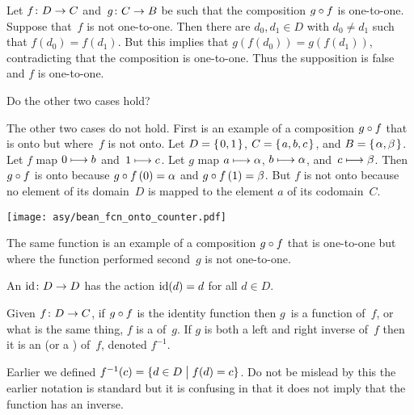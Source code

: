 \documentclass{ibl}  %
\begin{document}
\begin{problem}
\begin{exes}
\begin{exercise}
\end{exercise}
\begin{answer}
  Let $\mbox{$f\colon D\to C$}$ and~$\mbox{$g\colon C\to B$}$ be such that 
  the composition $g\mathbin{\circ} f$ is one-to-one.
  Suppose that~$f$ is not one-to-one.
  Then there are $d_0,d_1\in D$ with $d_0\neq d_1$ such that $f(d_0)=f(d_1)$.
  But this implies that $g(f(d_0))=g(f(d_1))$, contradicting that 
  the composition is one-to-one.
  Thus the supposition is false and $f$ is one-to-one.  
\end{answer}
\begin{exercise} 
  Do the other two cases hold? 
\end{exercise}
\begin{answer}
  The other two cases do not hold.
  First is an example of a composition $g\mathbin{\circ} f$ that is onto
  but where~$f$ is not onto.   
  Let $D=\mbox{$\{\hspace{0.1em}0,1\hspace{0.1em}\}$}$, $C=\mbox{$\{\hspace{0.1em}a,b,c\hspace{0.1em}\}$}$, and $B=\mbox{$\{\hspace{0.1em}\alpha, \beta\hspace{0.1em}\}$}$.
  Let $f$ map $0\stackrel{}{\longmapsto} b$ and~$1\stackrel{}{\longmapsto} c$.
  Let $g$ map $a\stackrel{}{\longmapsto} \alpha$, $b\stackrel{}{\longmapsto}\alpha$, 
  and~$c\stackrel{}{\longmapsto} \beta$. 
  Then $g\mathbin{\circ} f$ is onto because $g\mathbin{\circ} f\,(0)=\alpha$ and
  $g\mathbin{\circ} f\,(1)=\beta$.
  But $f$ is not onto because no element of its domain~$D$ is mapped to the
  element $a$ of its codomain~$C$. 
  \begin{center}
    \texttt{[image: asy/bean\_fcn\_onto\_counter.pdf]}
  \end{center}
  The same function is an example of a composition $g\mathbin{\circ} f$ 
  that is one-to-one but where
  the function performed second~$g$ is not one-to-one.
\end{answer}
\end{exes}
\end{problem}

\begin{df}
An  $\mbox{$\operatorname{id}\colon D\to D$}$ has the action
$\operatorname{id}(d)=d$ for all $d\in D$.
\end{df}

\begin{df}
Given $\mbox{$f\colon D\to C$}$,
if $g\mathbin{\circ} f$ is the identity function then 
$g$~is a  function of~$f$, or what is the
same thing, $f$ is a  of~$g$.
If $g$ is both a left and right inverse of~$f$ then
it is an 
(or a ) of~$f$, denoted $f^{-1}$. 
\end{df}

Earlier we defined
$f^{-1}(c)=\{d\in D \bigm| f(d)=c\}$.
Do not be mislead by this\Dash 
the earlier notation is standard but it is confusing in that it
does not imply that the function has an inverse.
\end{document}
